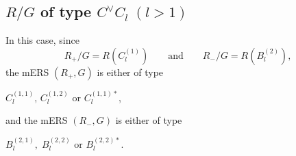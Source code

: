 \documentclass[11pt]{amsart}
\begin{document}


\subsection{$R/G$ of type $C^\vee C_l\; (l> 1)$}\label{subsect_CC-l}
In this case, since 
\[ R_+/G=R(C_l^{(1)}) \qquad \text{and} \qquad  R_-/G=R(B_l^{(2)}), \] 
the mERS $(R_+,G)$ is either of type \\
\centerline{$C_l^{(1,1)}, \, C_l^{(1,2)}$ or $C_l^{(1,1)\ast}$,}
and the mERS $(R_-,G)$ is either of type \\
\centerline{$B_l^{(2,1)}, \; B_l^{(2,2)}$ or $B_l^{(2,2)\ast}$. }




 \quad \\
\end{document}

